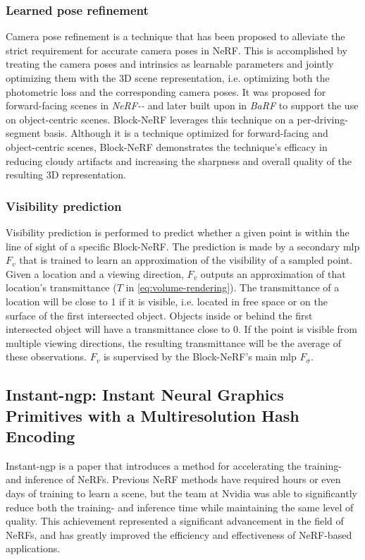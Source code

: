\subsubsection{Learned pose refinement} \label{sec:camera-pose-refinement}
Camera pose refinement is a technique that has been proposed to alleviate the strict requirement for accurate camera poses in NeRF. This is accomplished by treating the camera poses and intrinsics as learnable parameters and jointly optimizing them with the 3D scene representation, i.e. optimizing both the photometric loss and the corresponding camera poses. It was proposed for forward-facing scenes in \textit{NeRF\nobreakdash-\nobreakdash-} \cite{wang_nerf--_2022} and later built upon in \textit{BaRF} \cite{lin_barf_2021} to support the use on object-centric scenes. Block-NeRF leverages this technique on a per-driving-segment basis. Although it is a technique optimized for forward-facing and object-centric scenes, Block-NeRF demonstrates the technique's efficacy in reducing cloudy artifacts and increasing the sharpness and overall quality of the resulting 3D representation.


\subsubsection{Visibility prediction} \label{sec:visibility-prediction}
Visibility prediction is performed to predict whether a given point is within the line of sight of a specific Block-NeRF. The prediction is made by a secondary \acrshort{mlp} $F_v$ that is trained to learn an approximation of the visibility of a sampled point. Given a location and a viewing direction, $F_v$ outputs an approximation of that location's transmittance ($T$ in \autoref{eq:volume-rendering}). The transmittance of a location will be close to 1 if it is visible, i.e. located in free space or on the surface of the first intersected object. Objects inside or behind the first intersected object will have a transmittance close to 0. If the point is visible from multiple viewing directions, the resulting transmittance will be the average of these observations. $F_v$ is supervised by the Block-NeRF's main \acrshort{mlp} $F_\sigma$.



\subsection[Instant-ngp]{Instant-ngp: Instant Neural Graphics Primitives with a Multiresolution Hash Encoding} \label{sec:instant-ngp}
Instant-ngp \cite{muller_instant_2022} is a paper that introduces a method for accelerating the training- and inference of NeRFs. Previous NeRF methods have required hours or even days of training to learn a scene, but the team at Nvidia was able to significantly reduce both the training- and inference time while maintaining the same level of quality. This achievement represented a significant advancement in the field of NeRFs, and has greatly improved the efficiency and effectiveness of NeRF-based applications.


